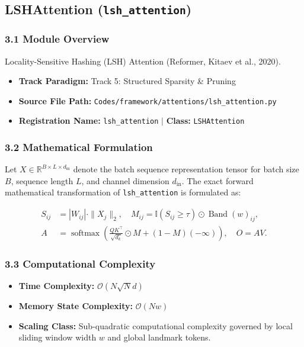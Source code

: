 \subsection{LSHAttention (\texttt{lsh\_attention})}
\label{sec:app_module_lsh_attention}

\subsubsection*{3.1 Module Overview}
Locality-Sensitive Hashing (LSH) Attention (Reformer, Kitaev et al., 2020).
\begin{itemize}
    \item \textbf{Track Paradigm:} Track 5: Structured Sparsity \& Pruning
    \item \textbf{Source File Path:} \texttt{Codes/framework/attentions/lsh\_attention.py}
    \item \textbf{Registration Name:} \texttt{lsh\_attention} $\mid$ \textbf{Class:} \texttt{LSHAttention}
\end{itemize}

\subsubsection*{3.2 Mathematical Formulation}
Let $X \in \mathbb{R}^{B \times L \times d_{\text{in}}}$ denote the batch sequence representation tensor for batch size $B$, sequence length $L$, and channel dimension $d_{\text{in}}$. The exact forward mathematical transformation of \texttt{lsh\_attention} is formulated as:

\begin{align}
S_{ij} &= |W_{ij}| \cdot \|X_j\|_2, \quad M_{ij} = \mathbb{I}(S_{ij} \ge \tau) \odot \operatorname{Band}(w)_{ij}, \\
A &= \operatorname{softmax}\left(\frac{Q K^\top}{\sqrt{d_k}} \odot M + (1 - M)(-\infty)\right), \quad O = A V.
\end{align}


\subsubsection*{3.3 Computational Complexity}
\begin{itemize}
    \item \textbf{Time Complexity:} $\mathcal{O}(N \sqrt{N} d)$
    \item \textbf{Memory State Complexity:} $\mathcal{O}(N w)$
    \item \textbf{Scaling Class:} Sub-quadratic computational complexity governed by local sliding window width $w$ and global landmark tokens.
\end{itemize}

